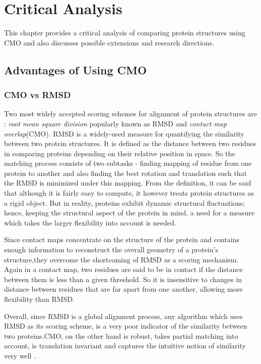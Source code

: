\chapter{Critical Analysis}
\label{critique}
This chapter provides a critical analysis of comparing protein structures using CMO and also discusses possible extensions and research directions.

\section{Advantages of Using CMO}
\subsection{CMO vs RMSD}
Two most widely accepted scoring schemes for alignment of protein structures are : \emph{root mean square division} popularly known as RMSD \citep{kabsch76} and \emph{contact map overlap}(CMO). RMSD is a widely-used measure for quantifying the similarity between two protein structures. It is defined as the distance between two residues in comparing proteins depending on their relative position in space. So the matching process consists of two subtasks -  finding mapping of residue from one protein to another and also finding the best rotation and translation such that the RMSD is minimized under this mapping. From the definition, it can be said that although it is fairly easy to compute, it however treats protein structures as a rigid object. But in reality, proteins exhibit dynamic structural fluctuations; hence, keeping the structural aspect of the protein in mind, a need for a measure which takes the larger flexibility into account is needed.

Since contact maps concentrate on the structure of the protein and contains enough information to reconstruct the overall geometry of a protein's structure,they overcome the shortcoming of RMSD as a scoring mechanism. Again in a contact map, two residues are said to be in contact if the distance between them is less than a  given threshold. So it is insensitive to changes in distance between residues that are far apart from one another, allowing more flexibility than RMSD.

Overall, since RMSD is a global alignment process, any algorithm which uses RMSD as its scoring scheme, is a very poor indicator of the similarity between two proteins.CMO, on the other hand is robust, takes partial matching into account, is translation invariant and captures the intuitive notion of similarity very well \citep{agmw07}.

